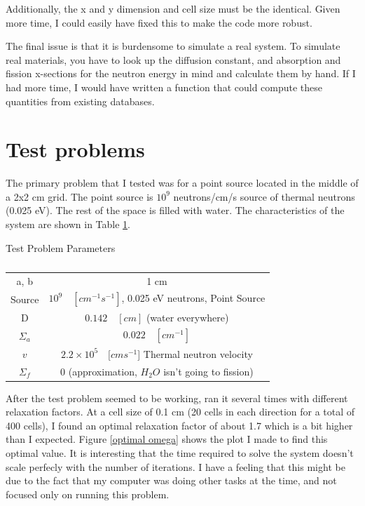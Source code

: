 \documentclass[a4paper,12pt]{article}
\begin{document}
Additionally, the x and y dimension and cell size must be the identical. Given more time, I could easily have fixed this to make the code more robust.

The final issue is that it is burdensome to simulate a real system. To simulate real materials, you have to look up the diffusion constant, and absorption and fission x-sections  for the neutron energy in mind and calculate them by hand. If I had more time, I would have written a function that could compute these quantities from existing databases.


\section{Test problems}\label{test problem}
The primary problem that I tested was for a point source located in the middle of a 2x2 cm grid. The point source is $10^{9}$ neutrons/cm/s source of thermal neutrons (0.025 eV). The rest of the space is filled with water. The characteristics of the system are shown in Table \ref{test table}.

\begin{table}[h]
\begin{center}
Test Problem Parameters\\
\footnotesize
\begin{tabular}{c c}
\hline \hline
a, b & 1 cm\\
Source & $10^{9} \quad [cm^{-1}s^{-1}]$, 0.025 eV neutrons, Point Source\\
D & $0.142 \quad [cm]$ (water everywhere)\\
$\Sigma_{a}$ & $0.022 \quad [cm^{-1}]$ \\
$v$ & $2.2\times10^{5} \quad [cm s^{-1}$] Thermal neutron velocity\\
$\Sigma_{f}$ & 0 (approximation, $H_{2}O$ isn't going to fission)\\
\hline
\end{tabular}
\caption{\label{test table}}
\end{center}
\end{table}

After the test problem seemed to be working, ran it several times with different relaxation factors. At a cell size of 0.1 cm (20 cells in each direction for a total of 400 cells), I found an optimal relaxation factor of about 1.7 which is a bit higher than I expected. Figure \ref{optimal omega} shows the plot I made to find this optimal value. It is interesting that the time required to solve the system doesn't scale perfecly with the number of iterations. I have a feeling that this might be due to the fact that my computer was doing other tasks at the time, and not focused only on running this problem.
\end{document}

